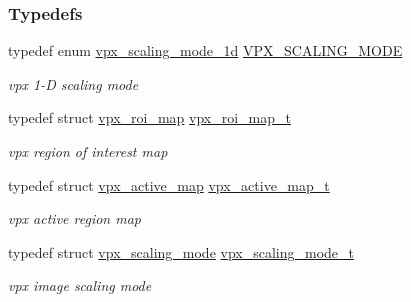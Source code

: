 \subsubsection*{\-Typedefs}
\begin{DoxyCompactItemize}
\item 
typedef enum \hyperlink{group__vp8__encoder_ga70071b1bb6cac9a1ef0ea3d8362ff94f}{vpx\-\_\-scaling\-\_\-mode\-\_\-1d} \hyperlink{group__vp8__encoder_ga100ca891ad96995e61780ae777bf8663}{\-V\-P\-X\-\_\-\-S\-C\-A\-L\-I\-N\-G\-\_\-\-M\-O\-D\-E}
\begin{DoxyCompactList}\small\item\em vpx 1-\/\-D scaling mode \end{DoxyCompactList}\item 
typedef struct \hyperlink{structvpx__roi__map}{vpx\-\_\-roi\-\_\-map} \hyperlink{group__vp8__encoder_ga5be1a94d436a5e9296f5be06f57ccbd1}{vpx\-\_\-roi\-\_\-map\-\_\-t}
\begin{DoxyCompactList}\small\item\em vpx region of interest map \end{DoxyCompactList}\item 
typedef struct \hyperlink{structvpx__active__map}{vpx\-\_\-active\-\_\-map} \hyperlink{group__vp8__encoder_ga7b48f7962f5061979f0f8ece6fb1cba8}{vpx\-\_\-active\-\_\-map\-\_\-t}
\begin{DoxyCompactList}\small\item\em vpx active region map \end{DoxyCompactList}\item 
typedef struct \hyperlink{structvpx__scaling__mode}{vpx\-\_\-scaling\-\_\-mode} \hyperlink{group__vp8__encoder_ga9600359ed9096cd96c621d9cf6c8df38}{vpx\-\_\-scaling\-\_\-mode\-\_\-t}
\begin{DoxyCompactList}\small\item\em vpx image scaling mode \end{DoxyCompactList}\end{DoxyCompactItemize}

